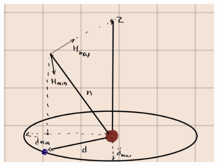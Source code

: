 \begin{figure}[H]
    \centering
    \includegraphics[trim={0 0 0 0},clip,width=1\textwidth]{sours_img/rot.jpg}
\end{figure}


